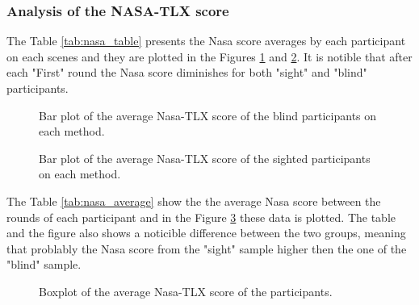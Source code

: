 \FloatBarrier



\subsubsection{Analysis of the NASA-TLX score}

The Table \ref{tab:nasa_table} presents the Nasa score averages by each participant on each scenes and they are plotted in the Figures \ref{fig:barplot_nasa_scene_blind} and \ref{fig:barplot_nasa_scene_sight}. It is notible that after each "First" round the Nasa score diminishes for both "sight" and "blind" participants.



\begin{figure}[!htb]
    \centering
    \resizebox{0.6\linewidth}{!}{
        
    }
    \caption{Bar plot of the average Nasa-TLX score of the blind participants on each method.}
    \label{fig:barplot_nasa_scene_blind}
\end{figure}

\begin{figure}[!htb]
    \centering
    \resizebox{0.6\linewidth}{!}{
        
    }
    \caption{Bar plot of the average Nasa-TLX score of the sighted participants on each method.}
    \label{fig:barplot_nasa_scene_sight}
\end{figure}

The Table \ref{tab:nasa_average} show the the average Nasa score between the rounds of each participant and in the Figure \ref{fig:boxplot_nasa_scene} these data is plotted. The table and the figure also shows a noticible difference between the two groups, meaning that problably the Nasa score from the "sight" sample higher then the one of the "blind" sample.



\begin{figure}[!htb]
    \centering
    \resizebox{0.6\linewidth}{!}{
    
    }
    \caption{Boxplot of the average Nasa-TLX score of the participants.}
    \label{fig:boxplot_nasa_scene}
\end{figure}

